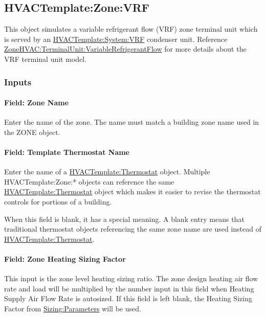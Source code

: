 \subsection{HVACTemplate:Zone:VRF}\label{hvactemplatezonevrf}

This object simulates a variable refrigerant flow (VRF) zone terminal unit which is served by an \hyperref[hvactemplatesystemvrf]{HVACTemplate:System:VRF} condenser unit. Reference \hyperref[zonehvacterminalunitvariablerefrigerantflow]{ZoneHVAC:TerminalUnit:VariableRefrigerantFlow} for more details about the VRF terminal unit model.

\subsubsection{Inputs}\label{inputs-7-011}

\paragraph{Field: Zone Name}\label{field-zone-name-6-001}

Enter the name of the zone. The name must match a building zone name used in the ZONE object.

\paragraph{Field: Template Thermostat Name}\label{field-template-thermostat-name-6}

Enter the name of a \hyperref[hvactemplatethermostat]{HVACTemplate:Thermostat} object. Multiple HVACTemplate:Zone:* objects can reference the same \hyperref[hvactemplatethermostat]{HVACTemplate:Thermostat} object which makes it easier to revise the thermostat controls for portions of a building.

When this field is blank, it has a special meaning. A blank entry means that traditional thermostat objects referencing the same zone name are used instead of \hyperref[hvactemplatethermostat]{HVACTemplate:Thermostat}.

\paragraph{Field: Zone Heating Sizing Factor}\label{field-zone-heating-sizing-factor-5}

This input is the zone level heating sizing ratio. The zone design heating air flow rate and load will be multiplied by the number input in this field when Heating Supply Air Flow Rate is autosized. If this field is left blank, the Heating Sizing Factor from \hyperref[sizingparameters]{Sizing:Parameters} will be used.

